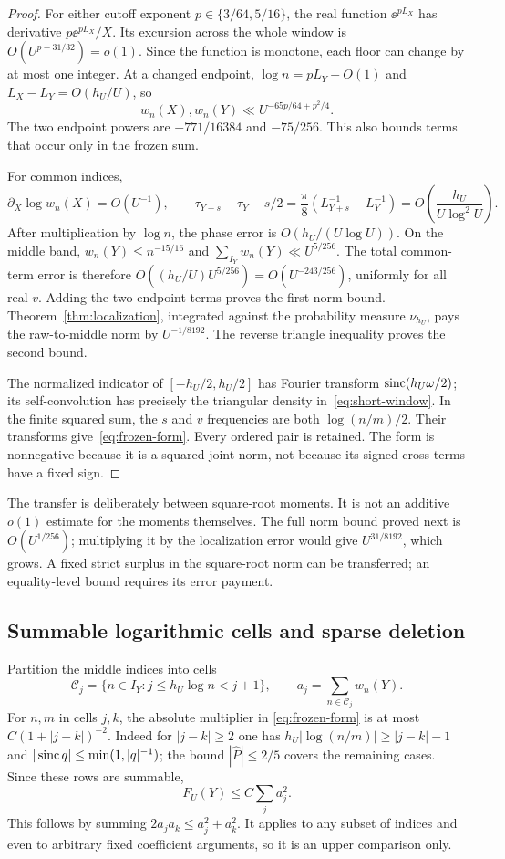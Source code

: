 \begin{proof}
For either cutoff exponent $p\in\{3/64,5/16\}$, the real function
$\ee^{pL_X}$ has derivative $p\ee^{pL_X}/X$. Its excursion across
the whole window is $O(U^{p-31/32})=o(1)$.
Since the function is monotone, each floor can change by at most one
integer. At a changed endpoint, $\log n=pL_Y+O(1)$ and
$L_X-L_Y=O(h_U/U)$, so
\[
 w_n(X),w_n(Y)\ll U^{-65p/64+p^2/4}.
\]
The two endpoint powers are $-771/16384$ and $-75/256$.
This also bounds terms that occur only in the frozen sum.

For common indices,
\[
 \partial_X\log w_n(X)=O(U^{-1}),\qquad
 \tau_{Y+s}-\tau_Y-s/2
 =\frac\pi8(L_{Y+s}^{-1}-L_Y^{-1})
 =O\left(\frac{h_U}{U\log^2U}\right).
\]
After multiplication by $\log n$, the phase error is
$O(h_U/(U\log U))$. On the middle band,
$w_n(Y)\le n^{-15/16}$ and $\sum_{I_Y}w_n(Y)\ll U^{5/256}$.
The total common-term error is therefore
$O((h_U/U)U^{5/256})=O(U^{-243/256})$, uniformly for all real $v$.
Adding the two endpoint terms proves the first norm bound.
Theorem~\ref{thm:localization}, integrated against the probability
measure $\nu_{h_U}$, pays the raw-to-middle norm by $U^{-1/8192}$.
The reverse triangle inequality proves the second bound.

The normalized indicator of $[-h_U/2,h_U/2]$ has Fourier transform
$\operatorname{sinc}(h_U\omega/2)$; its self-convolution has precisely the triangular
density in~\eqref{eq:short-window}. In the finite squared sum,
the $s$ and $v$ frequencies are both $\log(n/m)/2$.
Their transforms give~\eqref{eq:frozen-form}. Every ordered pair is
retained. The form is nonnegative because it is a squared joint norm,
not because its signed cross terms have a fixed sign.
\end{proof}

The transfer is deliberately between square-root moments. It is not
an additive $o(1)$ estimate for the moments themselves. The full norm
bound proved next is $O(U^{1/256})$; multiplying it by the localization
error would give $U^{31/8192}$, which grows. A fixed strict surplus
in the square-root norm can be transferred; an equality-level bound
requires its error payment.

\subsection{Summable logarithmic cells and sparse deletion}

Partition the middle indices into cells
\[
 \mathcal C_j=\{n\in I_Y:j\le h_U\log n<j+1\},\qquad
 a_j=\sum_{n\in\mathcal C_j}w_n(Y).
\]
For $n,m$ in cells $j,k$, the absolute multiplier in
\eqref{eq:frozen-form} is at most $C(1+|j-k|)^{-2}$.
Indeed for $|j-k|\ge2$ one has
$h_U|\log(n/m)|\ge|j-k|-1$ and
$|\operatorname{sinc} q|\le\min(1,|q|^{-1})$; the bound
$|\widehat P|\le2/5$ covers the remaining cases.
Since these rows are summable,
\begin{equation}\label{eq:cell-row}
 F_U(Y)\le C\sum_ja_j^2.
\end{equation}
This follows by summing $2a_ja_k\le a_j^2+a_k^2$.
It applies to any subset of indices and even to arbitrary fixed
coefficient arguments, so it is an upper comparison only.

